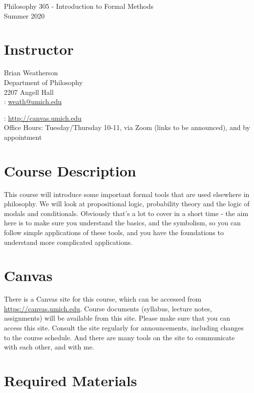 \documentclass[10pt]{article}
\begin{document}
{\LARGE Philosophy 305 - Introduction to Formal Methods}\\[0.5cm]
{\large Summer 2020}

\section*{Instructor}

Brian Weatherson \\
Department of Philosophy \\
2207 Angell Hall \\

\Letter: \href{mailto:weath@umich.edu}{weath@umich.edu}

\ComputerMouse: \href{http://canvas.umich.edu}{http://canvas.umich.edu} \\

Office Hours: Tuesday/Thursday 10-11, via Zoom (links to be announced), and by appointment \\

\section*{Course Description}

This course will introduce some important formal tools that are used elsewhere in philosophy. We will look at propositional logic, probability theory and the logic of modals and conditionals. Obviously that's a lot to cover in a short time - the aim here is to make sure you understand the basics, and the symbolism, so you can follow simple applications of these tools, and you have the foundations to understand more complicated applications.

\section*{Canvas}

There is a Canvas site for this course, which can be accessed from \url{https://canvas.umich.edu}. Course documents (syllabus, lecture notes, assignments) will be available from this site. Please make sure that you can access this site. Consult the site regularly for announcements, including changes to the course schedule. And there are many tools on the site to communicate with each other, and with me. 

\section*{Required Materials}
\end{document}
